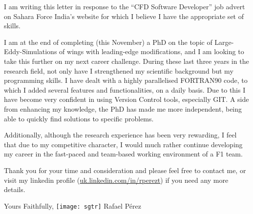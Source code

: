 \documentclass[10pt,stdletter,dateno,sigleft]{newlfm} %
\begin{document}
\begin{newlfm}


I am writing this letter in response to the ``CFD Software Developer'' job advert on Sahara Force
India's website for which I believe I have the appropriate set of skills. 

I am at the end of completing (this November) a PhD on the topic of Large-Eddy-Simulations
of wings with leading-edge modifications, and I am looking to take this further on my next
career challenge. During these last three years in the research field, not only have I
strengthened my scientific background but my programming skills. I have dealt with a
highly parallelised FORTRAN90 code, to which I added several features and functionalities,
on a daily basis. Due to this I have become very confident in using Version Control tools,
especially GIT. A side from enhancing my knowledge, the PhD has made me more
independent, being able to quickly find solutions to specific problems. 

Additionally, although the research experience has been very rewarding, I feel that due to
my competitive character, I would much rather continue developing my career in the
fast-paced and team-based working environment of a F1 team.

Thank you for your time and consideration and please feel free to contact me, or visit my
linkedin profile (\href{https://uk.linkedin.com/in/rperezt}{uk.linkedin.com/in/rperezt})
if you need any more details.

Yours Faithfully, \newline %
\texttt{[image: sgtr]} \newline 
Rafael P\'erez


\end{newlfm}
\end{document}
